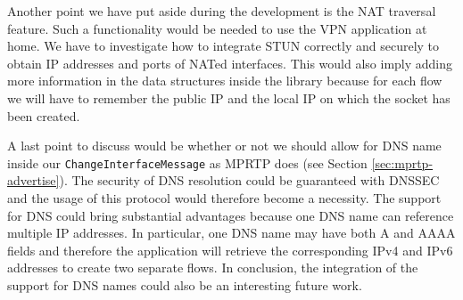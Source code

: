 Another point we have put aside during the development is the NAT traversal feature. Such a functionality would be needed to use the VPN application at home. We have to investigate how to integrate STUN \cite{RFC5389} correctly and securely to obtain IP addresses and ports of NATed interfaces. This would also imply adding more information in the data structures inside the library because for each flow we will have to remember the public IP and the local IP on which the socket has been created.

A last point to discuss would be whether or not we should allow for DNS name inside our \texttt{ChangeInterfaceMessage} as MPRTP does (see Section \ref{sec:mprtp-advertise}). The security of DNS resolution could be guaranteed with DNSSEC \cite{RFC6840} and the usage of this protocol would therefore become a necessity. The support for DNS could bring substantial advantages because one DNS name can reference multiple IP addresses. In particular, one DNS name may have both A and AAAA fields and therefore the application will retrieve the corresponding IPv4 and IPv6 addresses to create two separate flows. In conclusion, the integration of the support for DNS names could also be an interesting future work.


